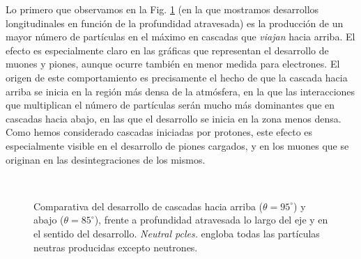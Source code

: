\documentclass[11 pt, a4paper]{article} %
\numberwithin{equation}{section}
\numberwithin{figure}{section}
\numberwithin{table}{section}
\begin{document}
Lo primero que observamos en la Fig. \ref{comp_ugdg} (en la que mostramos desarrollos longitudinales en función de la profundidad atravesada) es la producción de un mayor número de partículas en el máximo en cascadas que \textit{viajan} hacia arriba. El efecto es especialmente claro en las gráficas que representan el desarrollo de muones y piones, aunque ocurre también en menor medida para electrones. El origen de este comportamiento es precisamente el hecho de que la cascada hacia arriba se inicia en la región más densa de la atmósfera, en la que las interacciones que multiplican el número de partículas serán mucho más dominantes que en cascadas hacia abajo, en las que el desarrollo se inicia en la zona menos densa. Como hemos considerado cascadas iniciadas por protones, este efecto es especialmente visible en el desarrollo de piones cargados, y en los muones que se originan en las desintegraciones de los mismos.
\begin{figure}[H]
	\centering
	\\
	\caption{Comparativa del desarrollo de cascadas hacia arriba ($\theta = 95^\circ$) y abajo ($\theta=85^\circ$), frente a profundidad atravesada lo largo del eje y en el sentido del desarrollo. \textit{Neutral pcles.} engloba todas las partículas neutras producidas excepto neutrones.}
	\label{comp_ugdg}
\end{figure}
\end{document}
